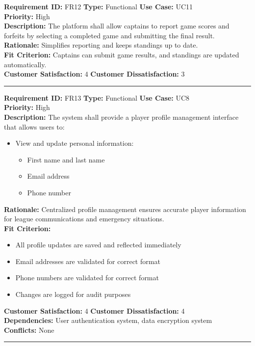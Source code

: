 \documentclass[12pt, titlepage]{article}
\begin{document}
\textbf{Requirement ID:} FR12 \quad \textbf{Type:} Functional \quad \textbf{Use Case:} UC11 \\
\textbf{Priority:} High \\
\textbf{Description:} The platform shall allow captains to report game scores and forfeits by selecting a completed game and submitting the final result.\\
\textbf{Rationale:} Simplifies reporting and keeps standings up to date.\\
\textbf{Fit Criterion:} Captains can submit game results, and standings are updated automatically. \\
\textbf{Customer Satisfaction:} 4 \quad\quad \textbf{Customer Dissatisfaction:} 3\\
\noindent\rule{\textwidth}{1pt}

\textbf{Requirement ID:} FR13 \quad \textbf{Type:} Functional \quad \textbf{Use Case:} UC8 \\
\textbf{Priority:} High \\
\textbf{Description:} The system shall provide a player profile management interface that allows users to:
\begin{itemize}
    \item View and update personal information:
    \begin{itemize}
        \item First name and last name
        \item Email address
        \item Phone number
    \end{itemize}
\end{itemize}
\textbf{Rationale:} Centralized profile management ensures accurate player information for league communications and emergency situations.\\
\textbf{Fit Criterion:} 
\begin{itemize}
    \item All profile updates are saved and reflected immediately
    \item Email addresses are validated for correct format
    \item Phone numbers are validated for correct format
    \item Changes are logged for audit purposes
\end{itemize}
\textbf{Customer Satisfaction:} 4 \quad\quad \textbf{Customer Dissatisfaction:} 4\\
\textbf{Dependencies:} User authentication system, data encryption system\\
\textbf{Conflicts:} None\\
\noindent\rule{\textwidth}{1pt}
\end{document}
